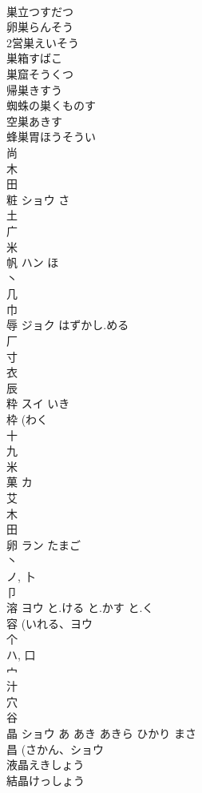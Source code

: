 \documentclass[8pt]{extreport}
\begin{document}
\begin{CJK}{UTF8}{min}
\\	巣立つすだつ
\\	卵巣らんそう
\\	2営巣えいそう
\\	巣箱すばこ
\\	巣窟そうくつ
\\	帰巣きすう
\\	蜘蛛の巣くものす
\\	空巣あきす
\\	蜂巣胃ほうそうい
\\	尚 
\\	木 
\\	田 
\\	粧	ショウ	さ	
\\	土 
\\	广 
\\	米 
\\	帆	ハン	ほ	
\\	丶 
\\	几 
\\	巾 
\\	辱	ジョク	はずかし.める	
\\	厂 
\\	寸 
\\	衣 
\\	辰 
\\	粋	スイ	いき	
\\	枠 (わく 
\\	十 
\\	九 
\\	米 
\\	菓	カ		
\\	艾 
\\	木 
\\	田 
\\	卵	ラン	たまご	
\\	丶 
\\	ノ, 卜 
\\	卩 
\\	溶	ヨウ	と.ける と.かす と.く	
\\	容 (いれる、ヨウ 
\\	个 
\\	ハ, 口 
\\	宀 
\\	汁 
\\	穴 
\\	谷 
\\	晶	ショウ	あ あき あきら ひかり まさ	
\\	昌 (さかん、ショウ 
\\	液晶えきしょう 
\\	結晶けっしょう 

\end{CJK}
\end{document}
